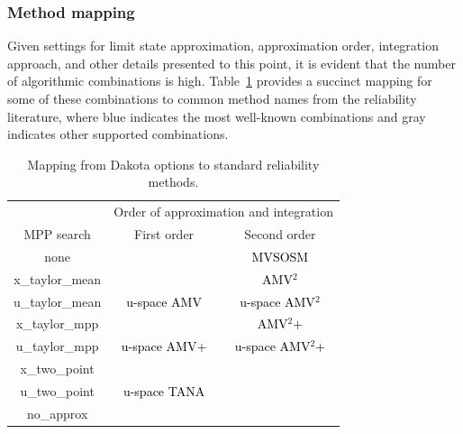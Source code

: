 \subsubsection{Method mapping} \label{uq:reliability:local:map}

Given settings for limit state approximation, approximation order,
integration approach, and other details presented to this point, it is
evident that the number of algorithmic combinations is high.
Table~\ref{tab:rel_meth_map} provides a succinct mapping for some of
these combinations to common method names from the reliability
literature, where blue indicates the most well-known combinations and
gray indicates other supported combinations.
\begin{table}
\centering
\caption{Mapping from Dakota options to standard reliability methods.}
\label{tab:rel_meth_map}
\begin{tabular}{|c|c|c|}
\hline
& \multicolumn{2}{c|}{Order of approximation and integration} \\ \cline{2-3}
MPP search      & First order & Second order                        \\ \hline
none            & \cellcolor{blue}\textcolor{white}{MVFOSM}
                & \cellcolor[gray]{0.5}\textcolor{black}{MVSOSM}   \\ \hline
x\_taylor\_mean & \cellcolor{blue}\textcolor{white}{AMV}
                & \cellcolor[gray]{0.5}\textcolor{black}{AMV$^2$}  \\ \hline
u\_taylor\_mean & \cellcolor[gray]{0.5}\textcolor{black}{u-space AMV}
                & \cellcolor[gray]{0.5}\textcolor{black}{u-space AMV$^2$} \\
\hline
x\_taylor\_mpp  & \cellcolor{blue}\textcolor{white}{AMV+}
                & \cellcolor[gray]{0.5}\textcolor{black}{AMV$^2$+} \\ \hline
u\_taylor\_mpp  & \cellcolor[gray]{0.5}\textcolor{black}{u-space AMV+}
                & \cellcolor[gray]{0.5}\textcolor{black}{u-space AMV$^2$+} \\
\hline
x\_two\_point   & \cellcolor{blue}\textcolor{white}{TANA}
                & \cellcolor[gray]{0.5}                             \\ \hline
u\_two\_point   & \cellcolor[gray]{0.5}\textcolor{black}{u-space TANA}
                & \cellcolor[gray]{0.5}                             \\ \hline
no\_approx      & \cellcolor{blue}\textcolor{white}{FORM}
                & \cellcolor{blue}\textcolor{white}{SORM}           \\ \hline
\end{tabular}
\end{table}

